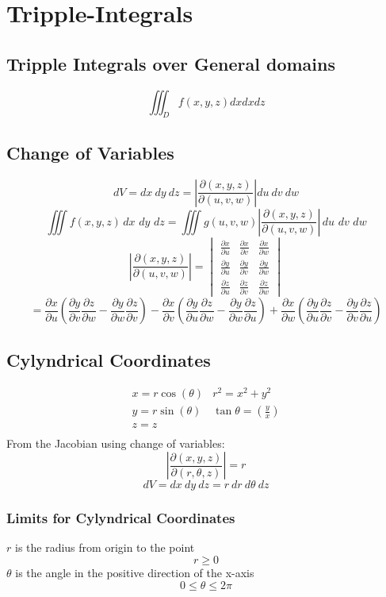 \section{Tripple-Integrals}
\subsection{Tripple Integrals over General domains}
$$\iiint_Df(x,y,z)dxdxdz$$
\subsection{Change of Variables}
$$dV=dx\ dy\ dz= \left|\frac{\partial (x,y,z)}{\partial (u,v,w)}\right|du\ dv\ dw$$
$$\iiint f(x,y,z)\,d x\,\,d y\,\,d z=\iiint g(u,v,w)\left|{\frac{\partial(x,y,z)}{\partial(u,v,w)}}\right|\,d u\,\,d v\,\,d w$$
$$\left|\frac{\partial(x,y,z)}{\partial(u,v,w)}\right|=
\begin{vmatrix}
  \frac{\partial x}{\partial u}&\frac{\partial x}{\partial v}&\frac{\partial x}{\partial w}\\
  \frac{\partial y}{\partial u}&\frac{\partial y}{\partial v}&\frac{\partial y}{\partial w}\\
  \frac{\partial z}{\partial u}&\frac{\partial z}{\partial v}&\frac{\partial z}{\partial w}
\end{vmatrix}$$
$$=\frac{\partial x}{\partial u}\left( \frac{\partial y}{\partial v}\frac{\partial z}{\partial w}-\frac{\partial y}{\partial w}\frac{\partial z}{\partial v}\right)
-\frac{\partial x}{\partial v}\left(\frac{\partial y}{\partial u}\frac{\partial z}{\partial w}-\frac{\partial y}{\partial w}\frac{\partial z}{\partial u}\right)
+\frac{\partial x}{\partial w}\left(\frac{\partial y}{\partial u}\frac{\partial z}{\partial v}-\frac{\partial y}{\partial v}\frac{\partial z}{\partial u}\right)$$
\subsection{Cylyndrical Coordinates}
$$\begin{array}{ll}
  x=r\cos(\theta)&r^2=x^2+y^2\\
  y=r\sin(\theta)&\tan\theta=(\frac{y}{x})\\
  z=z\\
\end{array}$$
From the Jacobian using change of variables:
$$\left|\frac{\partial(x,y,z)}{\partial(r,\theta,z)}\right|=r$$
$$dV=dx\ dy\ dz= r\ dr\ d\theta\ dz$$
\subsubsection{Limits for Cylyndrical Coordinates}
$r$ is the radius from origin to the point
$$r\geq 0$$
$\theta$ is the angle in the positive direction of the x-axis
$$0\leq\theta \leq 2\pi$$

